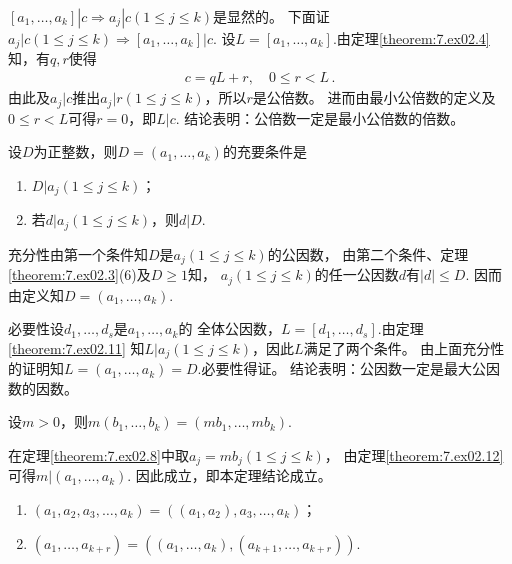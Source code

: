 \begin{prove}
    $[a_1,\ldots,a_k]|c\Rightarrow a_j|c(1\le j\le k)$是显然的。
    下面证$a_j|c(1\le j\le k)\Rightarrow [a_1,\ldots,a_k]|c$.
    设$L=[a_1,\ldots,a_k]$.由定理\ref{theorem:7.ex02.4}知，有$q,r$使得
    \begin{align}
        c=qL+r,\quad 0\le r<L\, .
    \end{align}
    由此及$a_j|c$推出$a_j|r(1\le j\le k)$，所以$r$是公倍数。
    进而由最小公倍数的定义及$0\le r<L$可得$r=0$，即$L|c$.
    结论表明：公倍数一定是最小公倍数的倍数。
\end{prove}
\begin{theorem}\label{theorem:7.ex02.12}
    设$D$为正整数，则$D=(a_1,\ldots,a_k)$的充要条件是
    \begin{enumerate}
        \item $D|a_j(1\le j\le k)$；
        \item 若$d|a_j(1\le j\le k)$，则$d|D$.
    \end{enumerate}
\end{theorem}
\begin{prove}
    {\sffamily 充分性}\quad 由第一个条件知$D$是$a_j(1\le j\le k)$的公因数，
    由第二个条件、定理\ref{theorem:7.ex02.3}(6)及$D\ge1$知，
    $a_j(1\le j\le k)$的任一公因数$d$有$|d|\le D$.
    因而由定义知$D=(a_1,\ldots,a_k)$.

        {\sffamily 必要性}\quad 设$d_1,\ldots,d_s$是$a_1,\ldots,a_k$的
    全体公因数，$L=[d_1,\ldots,d_s]$.由定理\ref{theorem:7.ex02.11}
    知$L|a_j(1\le j\le k)$，因此$L$满足了两个条件。
    由上面充分性的证明知$L=(a_1,\ldots,a_k)=D$.必要性得证。
    结论表明：公因数一定是最大公因数的因数。
\end{prove}
\begin{theorem}\label{theorem:7.ex02.13}
    设$m>0$，则$m(b_1,\ldots,b_k)=(mb_1,\ldots,mb_k)$.
\end{theorem}
\begin{prove}
    在定理\ref{theorem:7.ex02.8}中取$a_j=mb_j(1\le j\le k)$，
    由定理\ref{theorem:7.ex02.12}可得$m|(a_1,\ldots,a_k)$.
    因此成立，即本定理结论成立。
\end{prove}
\begin{theorem}\label{theorem:7.ex02.14}
    \begin{enumerate}
        \item $(a_1,a_2,a_3,\ldots,a_k)=((a_1,a_2),a_3,\ldots,a_k)$；
        \item $(a_1,\ldots,a_{k+r})=((a_1,\ldots,a_k),(a_{k+1},\ldots,a_{k+r}))$.
    \end{enumerate}
\end{theorem}
